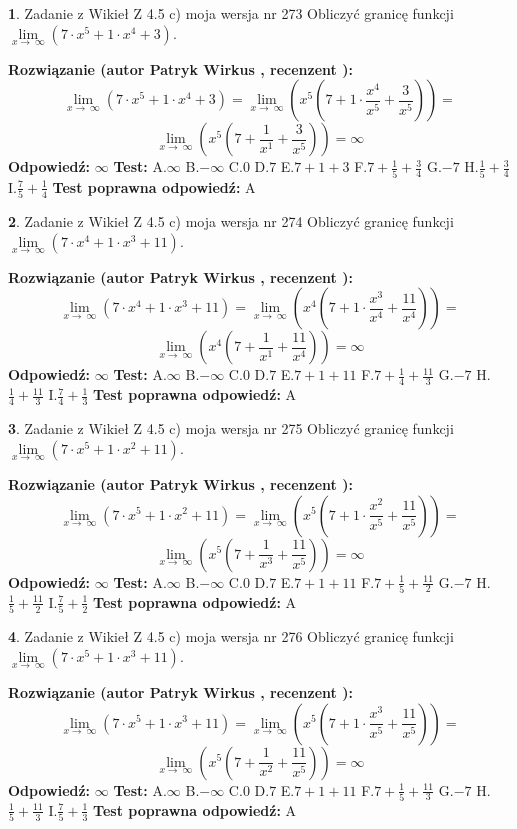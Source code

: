 \documentclass[12pt, a4paper]{article}
\theoremstyle{definition} %
\newtheorem{zad}{}
\newcommand{\zadStart}[1]{\begin{zad}#1\newline}
\newcommand{\zadStop}{\end{zad}}
\newcommand{\rozwStart}[2]{\noindent \textbf{Rozwiązanie (autor #1 , recenzent #2): }\newline}
\newcommand{\rozwStop}{\newline}
\newcommand{\odpStart}{\noindent \textbf{Odpowiedź:}\newline}
\newcommand{\odpStop}{\newline}
\newcommand{\testStart}{\noindent \textbf{Test:}\newline}
\newcommand{\testStop}{\newline}
\newcommand{\kluczStart}{\noindent \textbf{Test poprawna odpowiedź:}\newline}
\newcommand{\kluczStop}{\newline}
\begin{document}
\zadStart{Zadanie z Wikieł Z 4.5 c) moja wersja nr 273}
Obliczyć granicę funkcji  $\lim\limits_{x\to\ \infty}(7 \cdot x^{5}+1 \cdot x^{4}+3)$.
\zadStop
\rozwStart{Patryk Wirkus}{}
$$\lim\limits_{x\to\ \infty}(7 \cdot x^{5}+1 \cdot x^{4}+3) = \lim\limits_{x\to\ \infty}(x^{5}(7 +1 \cdot \frac{x^{4}}{x^{5}}+\frac{3}{x^{5}})) =$$ $$\lim\limits_{x\to\ \infty}(x^{5}(7 +\frac{1}{x^{1}}+\frac{3}{x^{5}})) =\infty$$
\rozwStop
\odpStart
$\infty$
\odpStop
\testStart
A.$\infty$ B.$-\infty$ C.$0$ D.$7$ E.$7 + 1 + 3$
F.$7+\frac{1}{5}+\frac{3}{4}$ G.$-7$
H.$\frac{1}{5}+\frac{3}{4}$
I.$\frac{7}{5}+\frac{1}{4}$
\testStop
\kluczStart
A
\kluczStop



\zadStart{Zadanie z Wikieł Z 4.5 c) moja wersja nr 274}
Obliczyć granicę funkcji  $\lim\limits_{x\to\ \infty}(7 \cdot x^{4}+1 \cdot x^{3}+11)$.
\zadStop
\rozwStart{Patryk Wirkus}{}
$$\lim\limits_{x\to\ \infty}(7 \cdot x^{4}+1 \cdot x^{3}+11) = \lim\limits_{x\to\ \infty}(x^{4}(7 +1 \cdot \frac{x^{3}}{x^{4}}+\frac{11}{x^{4}})) =$$ $$\lim\limits_{x\to\ \infty}(x^{4}(7 +\frac{1}{x^{1}}+\frac{11}{x^{4}})) =\infty$$
\rozwStop
\odpStart
$\infty$
\odpStop
\testStart
A.$\infty$ B.$-\infty$ C.$0$ D.$7$ E.$7 + 1 + 11$
F.$7+\frac{1}{4}+\frac{11}{3}$ G.$-7$
H.$\frac{1}{4}+\frac{11}{3}$
I.$\frac{7}{4}+\frac{1}{3}$
\testStop
\kluczStart
A
\kluczStop



\zadStart{Zadanie z Wikieł Z 4.5 c) moja wersja nr 275}
Obliczyć granicę funkcji  $\lim\limits_{x\to\ \infty}(7 \cdot x^{5}+1 \cdot x^{2}+11)$.
\zadStop
\rozwStart{Patryk Wirkus}{}
$$\lim\limits_{x\to\ \infty}(7 \cdot x^{5}+1 \cdot x^{2}+11) = \lim\limits_{x\to\ \infty}(x^{5}(7 +1 \cdot \frac{x^{2}}{x^{5}}+\frac{11}{x^{5}})) =$$ $$\lim\limits_{x\to\ \infty}(x^{5}(7 +\frac{1}{x^{3}}+\frac{11}{x^{5}})) =\infty$$
\rozwStop
\odpStart
$\infty$
\odpStop
\testStart
A.$\infty$ B.$-\infty$ C.$0$ D.$7$ E.$7 + 1 + 11$
F.$7+\frac{1}{5}+\frac{11}{2}$ G.$-7$
H.$\frac{1}{5}+\frac{11}{2}$
I.$\frac{7}{5}+\frac{1}{2}$
\testStop
\kluczStart
A
\kluczStop



\zadStart{Zadanie z Wikieł Z 4.5 c) moja wersja nr 276}
Obliczyć granicę funkcji  $\lim\limits_{x\to\ \infty}(7 \cdot x^{5}+1 \cdot x^{3}+11)$.
\zadStop
\rozwStart{Patryk Wirkus}{}
$$\lim\limits_{x\to\ \infty}(7 \cdot x^{5}+1 \cdot x^{3}+11) = \lim\limits_{x\to\ \infty}(x^{5}(7 +1 \cdot \frac{x^{3}}{x^{5}}+\frac{11}{x^{5}})) =$$ $$\lim\limits_{x\to\ \infty}(x^{5}(7 +\frac{1}{x^{2}}+\frac{11}{x^{5}})) =\infty$$
\rozwStop
\odpStart
$\infty$
\odpStop
\testStart
A.$\infty$ B.$-\infty$ C.$0$ D.$7$ E.$7 + 1 + 11$
F.$7+\frac{1}{5}+\frac{11}{3}$ G.$-7$
H.$\frac{1}{5}+\frac{11}{3}$
I.$\frac{7}{5}+\frac{1}{3}$
\testStop
\kluczStart
A
\kluczStop
\end{document}
